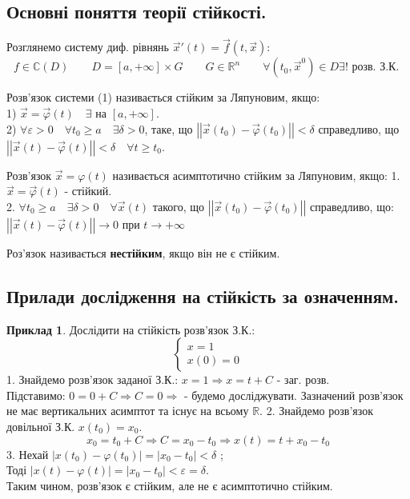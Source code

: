 \documentclass[14pt,a4paper]{scrartcl}
\theoremstyle{definition}
\newtheorem*{example}{Приклад}
\theoremstyle{remark}
\theoremstyle{definition}
\theoremstyle{definition}
\begin{document}
\subsection{Основні поняття теорії стійкості.}
Розглянемо систему диф. рівнянь $\vec{x}'(t) = \vec{f} (t, \vec{x})$:
$$f \in   \mathbb{C}(D)\qquad D = [a, +\infty ]  \times G\qquad G \in \mathbb{R}^{n} \qquad  \forall (t_0, \vec{x}^0) \in D  \exists! \text{ розв. З.К. } $$

\bd Розв'язок системи (1) називається стійким за Ляпуновим, якщо:\\
1) $\vec{x} = \vec{\varphi } (t)  \quad \exists$ на $[a, +\infty]$.\\
2) $\forall \varepsilon > 0 \quad \forall t_0 \geq a \quad \exists \delta > 0$, таке, що $ \left|\left| \vec{x}(t_0) - \vec{\varphi}(t_0) \right|\right| < \delta $ справедливо, що $ \left| \left|
\vec{x} (t) - \vec{\varphi} (t)
  \right|  \right|  < \delta  \quad \forall t \geq t_0$.
\ed

\bd
Розв'язок $ \vec{x} = \varphi(t) $ називається асимптотично стійким за Ляпуновим, якщо:
1. $ \vec{x} = \vec{\varphi} (t)$ - стійкий.\\
2. $\forall t_0 \geq a \quad \exists \delta > 0 \quad \forall \vec{x} (t) $ такого, що $ \left|
\left|  \vec{x} (t_0) - \vec{\varphi} (t_0) \right|
 \right| $ справедливо, що: \\ $  \left|
 \left|  \vec{x} (t) - \vec{\varphi} (t) \right|
  \right| \to 0   $ при $ t \to + \infty$
\ed

\def\vx{\vec{x}}
\def\vphi{\vec{\varphi}}
\def\vf{\vec{f}}

\bd
Роз'язок називається \textbf{нестійким}, якщо він не є стійким.
\ed

\subsection{Прилади дослідження на стійкість за означенням.}

\begin{example}
    Дослідити на стійкість розв'язок З.К.:
$$
\begin{cases}
    x = 1 \\
    x(0) = 0
\end{cases}
$$
1. Знайдемо розв'язок заданої З.К.: $x = 1 \Rightarrow x = t + C$ - заг. розв.\\
Підставимо: $ 0 = 0 + C \Longrightarrow C = 0 \Longrightarrow $  - будемо досліджувати.
Зазначений розв'язок не має вертикальних асимптот та існує на всьому $\mathbb{R}$.
2. Знайдемо розв'язок довільної З.К. $x(t_0) = x_0$.
$$
x_0 = t_0 + C \Rightarrow C = x_0 - t_0 \Rightarrow x(t) = t + x_0 - t_0
$$
3. Нехай $  \left| x(t_0) - \varphi(t_0) \right|  =  \left| x_0 - t_0 \right| < \delta  $ ;\\
Тоді $ \left| x (t) - \varphi (t) \right|  = \left|  x_0 - t_0 \right| < \varepsilon = \delta $.\\
Таким чином, розв'язок є стійким, але не є асимптотично стійким.

\end{example}
\end{document}
